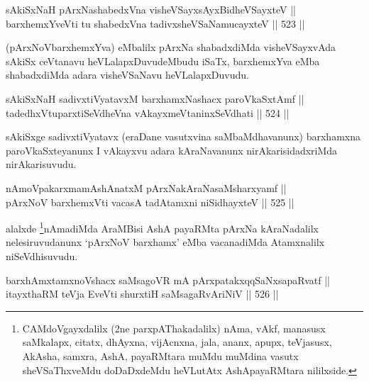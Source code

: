 \begin{shl}
sAkiSxNaH pArxNashabedxVna visheVSayxsAyxBidheVSayxteV || \\
barxhemxYveVti tu shabedxVna tadivxsheVSaNamucayxteV \hfill || 523 ||  
\end{shl}

\begin{artha}
(pArxNoVbarxhemxYva) eMbalilx pArxNa shabadxdiMda visheVSayxvAda
sAkiSx ceVtanavu heVLalapxDuvudeMbudu iSaTx, barxhemxYva eMba
shabadxdiMda adara visheVSaNavu heVLalapxDuvudu.
\end{artha}


\begin{shl}
sAkiSxNaH sadivxtiVyatavxM barxhamxNashacx paroVkaSxtAmf || \\
tadedhxVtuparxtiSeVdheVna vAkayxmeVtaninxSeVdhati \hfill || 524 ||  
\end{shl}

\begin{artha}
sAkiSxge sadivxtiVyatavx (eraDane vasutxvina saMbaMdhavanunx)
barxhamxna paroVkaSxteyanunx I vAkayxvu adara kAraNavanunx
nirAkarisidadxriMda nirAkarisuvudu.
\end{artha}

\begin{shl}
nAmoVpakarxmamAshAnatxM pArxNakAraNasaMsharxyamf || \\
pArxNoV barxhemxVti vacasA tadAtamxni niSidhayxteV \hfill || 525 ||  
\end{shl}

\begin{artha}
alalxde \footnote{CAMdoVgayxdalilx (2ne parxpAThakadalilx) nAma, vAkf,
manasusx saMkalapx, citatx, dhAyxna, vijAcnxna, jala, ananx, apupx,
teVjasusx, AkAsha, samxra, AshA, payaRMtara muMdu muMdina vasutx
sheVSaThxveMdu doDaDxdeMdu heVLutAtx AshApayaRMtara nililxside.}nAmadiMda AraMBisi AshA payaRMta pArxNa kAraNadalilx
nelesiruvudanunx `pArxNoV barxhamx' eMba vacanadiMda Atamxnalilx
niSeVdhisuvudu.
\end{artha}


\begin{shl}
barxhAmxtamxnoVshacx saMsagoVR mA pArxpatakxqqSaNxsapaRvatf || \\
itayxthaRM teVja EveVti shurxtiH saMsagaRvAriNiV \hfill || 526 ||  
\end{shl}

